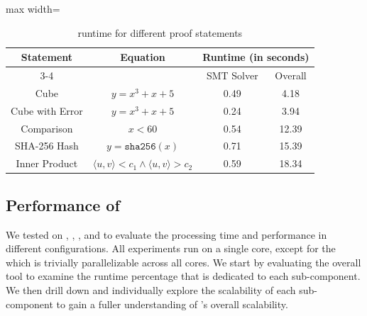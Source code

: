 \begin{table}[t]
\caption{\ConstraintChecker runtime for different proof statements}
\vspace*{6pt}
\centering
\begin{adjustbox}{max width=\textwidth}
\begin{tabular}{c|c|cc}
\hline
\multirow{2}{*}{Statement} & \multirow{2}{*}{Equation} & \multicolumn{2}{c}{Runtime (in seconds)} \\ \cline{3-4} 
                           &                           & \multicolumn{1}{c|}{SMT Solver}     & Overall    \\ \hline\hline
Cube                       & $y = x^3 + x + 5$         & \multicolumn{1}{c|}{0.49}           & 4.18       \\ \hline
Cube with Error            & $y = x^3 + x + 5$         & \multicolumn{1}{c|}{0.24}           & 3.94       \\ \hline
Comparison                 & $x < 60$                  & \multicolumn{1}{c|}{0.54}           & 12.39      \\ \hline
SHA-256 Hash               & $y = \texttt{sha256}(x)$    & \multicolumn{1}{c|}{0.71}           & 15.39      \\ \hline
Inner Product        & $\langle u,v \rangle < c_1 \land \langle u,v \rangle > c_2$ & \multicolumn{1}{c|}{0.59}           & 18.34      \\ \hline
\end{tabular}
\end{adjustbox}
\label{tab:snarkprobe-performance1}
\end{table}


\subsection{Performance of \SnarkFuzzer}
\label{subsec:snarkprobe-performance-fuzzer}

We tested \SnarkFuzzer on \libsnark, \bellman, \arkworks, and \gnark to evaluate the processing time and performance in different configurations.
All experiments run on a single core, except for the  which is trivially parallelizable across all cores.
We start by evaluating the overall tool to examine the runtime percentage that is dedicated to each sub-component.  We then drill down and individually explore the scalability of each sub-component to gain a fuller understanding of \SnarkFuzzer's overall scalability. %

